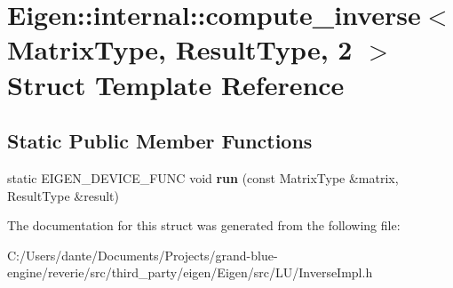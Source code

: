 \hypertarget{struct_eigen_1_1internal_1_1compute__inverse_3_01_matrix_type_00_01_result_type_00_012_01_4}{}\section{Eigen\+::internal\+::compute\+\_\+inverse$<$ Matrix\+Type, Result\+Type, 2 $>$ Struct Template Reference}
\label{struct_eigen_1_1internal_1_1compute__inverse_3_01_matrix_type_00_01_result_type_00_012_01_4}
\subsection*{Static Public Member Functions}
\begin{DoxyCompactItemize}
\item 
\mbox{\label{struct_eigen_1_1internal_1_1compute__inverse_3_01_matrix_type_00_01_result_type_00_012_01_4_a2180ced5f49fe944a9bdcdd0d45db391}} 
static E\+I\+G\+E\+N\+\_\+\+D\+E\+V\+I\+C\+E\+\_\+\+F\+U\+NC void {\bfseries run} (const Matrix\+Type \&matrix, Result\+Type \&result)
\end{DoxyCompactItemize}


The documentation for this struct was generated from the following file\+:\begin{DoxyCompactItemize}
\item 
C\+:/\+Users/dante/\+Documents/\+Projects/grand-\/blue-\/engine/reverie/src/third\+\_\+party/eigen/\+Eigen/src/\+L\+U/Inverse\+Impl.\+h\end{DoxyCompactItemize}
